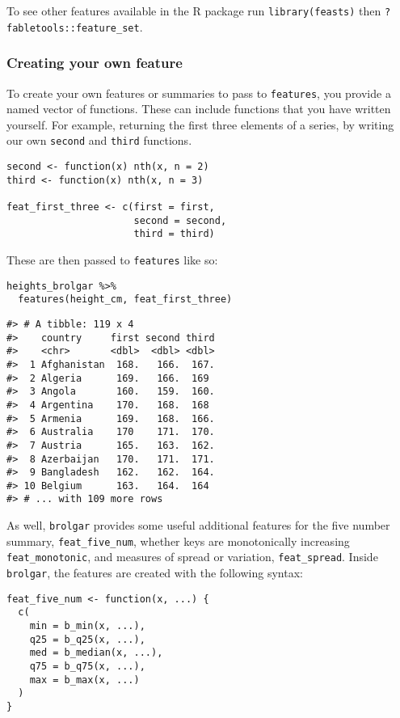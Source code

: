 To see other features available in the  R package run \texttt{library(feasts)} then \texttt{?fabletools::feature\_set}.

\hypertarget{creating-your-own-feature}{%
\subsubsection{Creating your own feature}\label{creating-your-own-feature}}

To create your own features or summaries to pass to \texttt{features}, you provide a named vector of functions. These can include functions that you have written yourself. For example, returning the first three elements of a series, by writing our own \texttt{second} and \texttt{third} functions.

\begin{verbatim}
second <- function(x) nth(x, n = 2)
third <- function(x) nth(x, n = 3)

feat_first_three <- c(first = first,
                      second = second,
                      third = third)
\end{verbatim}

These are then passed to \texttt{features} like so:

\begin{verbatim}
heights_brolgar %>%
  features(height_cm, feat_first_three)
\end{verbatim}

\begin{verbatim}
#> # A tibble: 119 x 4
#>    country     first second third
#>    <chr>       <dbl>  <dbl> <dbl>
#>  1 Afghanistan  168.   166.  167.
#>  2 Algeria      169.   166.  169 
#>  3 Angola       160.   159.  160.
#>  4 Argentina    170.   168.  168 
#>  5 Armenia      169.   168.  166.
#>  6 Australia    170    171.  170.
#>  7 Austria      165.   163.  162.
#>  8 Azerbaijan   170.   171.  171.
#>  9 Bangladesh   162.   162.  164.
#> 10 Belgium      163.   164.  164 
#> # ... with 109 more rows
\end{verbatim}

As well, \texttt{brolgar} provides some useful additional features for the five number summary, \texttt{feat\_five\_num}, whether keys are monotonically increasing \texttt{feat\_monotonic}, and measures of spread or variation, \texttt{feat\_spread}. Inside \texttt{brolgar}, the features are created with the following syntax:

\begin{verbatim}
feat_five_num <- function(x, ...) {
  c(
    min = b_min(x, ...),
    q25 = b_q25(x, ...),
    med = b_median(x, ...),
    q75 = b_q75(x, ...),
    max = b_max(x, ...)
  )
}
\end{verbatim}

